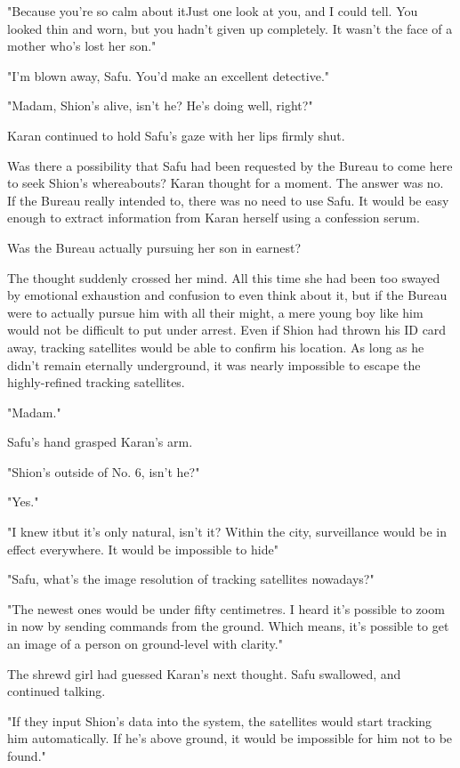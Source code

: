 "Because you're so calm about it\el Just one look at you, and I could
tell. You looked thin and worn, but you hadn't given up completely. It
wasn't the face of a mother who's lost her son."

"I'm blown away, Safu. You'd make an excellent detective."

"Madam, Shion's alive, isn't he? He's doing well, right?"

Karan continued to hold Safu's gaze with her lips firmly shut.

Was there a possibility that Safu had been requested by the Bureau to
come here to seek Shion's whereabouts? Karan thought for a moment. The
answer was no. If the Bureau really intended to, there was no need to
use Safu. It would be easy enough to extract information from Karan
herself using a confession serum.

Was the Bureau actually pursuing her son in earnest?

The thought suddenly crossed her mind. All this time she had been too
swayed by emotional exhaustion and confusion to even think about it, but
if the Bureau were to actually pursue him with all their might, a mere
young boy like him would not be difficult to put under arrest. Even if
Shion had thrown his ID card away, tracking satellites would be able to
confirm his location. As long as he didn't remain eternally underground,
it was nearly impossible to escape the highly-refined tracking
satellites.

"Madam."

Safu's hand grasped Karan's arm.

"Shion's outside of No. 6, isn't he?"

"Yes."

"I knew it\el but it's only natural, isn't it? Within the city,
surveillance would be in effect everywhere. It would be impossible to
hide\el "

"Safu, what's the image resolution of tracking satellites nowadays?"

"The newest ones would be under fifty centimetres. I heard it's possible
to zoom in now by sending commands from the ground. Which means, it's
possible to get an image of a person on ground-level with clarity."

The shrewd girl had guessed Karan's next thought. Safu swallowed, and
continued talking.

"If they input Shion's data into the system, the satellites would start
tracking him automatically. If he's above ground, it would be impossible
for him not to be found."


